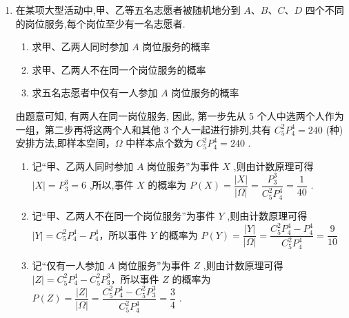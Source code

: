 \begin{enumerate}
\begin{enumerate}
\begin{jieda}
\begin{enumerate}
                \item 这个人输入的验证码有 $3\times3 = 9$ 种，则这个人输入的验证码正确的概率为 $\dfrac{1}{9}$
            \end{enumerate}
        \end{jieda}
        \item 在某项大型活动中,甲、乙等五名志愿者被随机地分到 $A\text{、}B\text{、}C\text{、}D$ 四个不同的岗位服务,每个岗位至少有一名志愿者.
        \begin{enumerate}
            \item 求甲、乙两人同时参加 $A$ 岗位服务的概率
            \item 求甲、乙两人不在同一个岗位服务的概率
            \item 求五名志愿者中仅有一人参加 $A$ 岗位服务的概率
        \end{enumerate}
        \begin{jieda}
        由题意可知, 有两人在同一岗位服务, 因此, 第一步先从 5 个人中选两个人作为一组，第二步再将这两个人和其他 3 个人一起进行排列,共有 ${{C}}_{5}^{2}{{P}}_{4}^{4} = {240}$ (种) 安排方法,即样本空间，$\Omega$ 中样本点个数为 ${{C}}_{5}^{2}{{P}}_{4}^{4} = {240}$ .
            \begin{enumerate}
                \item 记“甲、乙两人同时参加 $A$ 岗位服务”为事件 $X$ ,则由计数原理可得 $\left| X\right|  = {{P}}_{3}^{3} = 6$ ,所以,事件 $X$ 的概率为 $P\left( X\right)  = \dfrac{\left| X\right| }{\left| \Omega \right| } = \dfrac{{{P}}_{3}^{3}}{{{C}}_{5}^{2}{{P}}_{4}^{4}} = \dfrac{1}{40}$ .
                
                \item 记“甲、乙两人不在同一个岗位服务”为事件 $Y$ ,则由计数原理可得 $\left| Y\right|  = {{C}}_{5}^{2}{{P}}_{4}^{4} - {{P}}_{4}^{4}$，所以事件 $Y$ 的概率为 $P\left( Y\right)  = \dfrac{\left| Y\right| }{\left| \Omega \right| } = \dfrac{{{C}}_{5}^{2}{{P}}_{4}^{4} - {{P}}_{4}^{4}}{{{C}}_{5}^{2}{{P}}_{4}^{4}} = \dfrac{9}{10}$
                
                \item 记“仅有一人参加 $A$ 岗位服务”为事件 $Z$ ,则由计数原理可得 $\left| Z\right|  = {{C}}_{5}^{2}{{P}}_{4}^{4} - {{C}}_{5}^{2}{{P}}_{3}^{3}$，所以事件 $Z$ 的概率为 $P\left( Z\right)  = \dfrac{\left| Z\right| }{\left| \Omega \right| } = \dfrac{{{C}}_{5}^{2}{{P}}_{4}^{4} - {{C}}_{5}^{2}{{P}}_{3}^{3}}{{{C}}_{5}^{2}{{P}}_{4}^{4}} = \dfrac{3}{4}$ .
            \end{enumerate}
        \end{jieda}
    \end{enumerate}
    

\end{enumerate}
